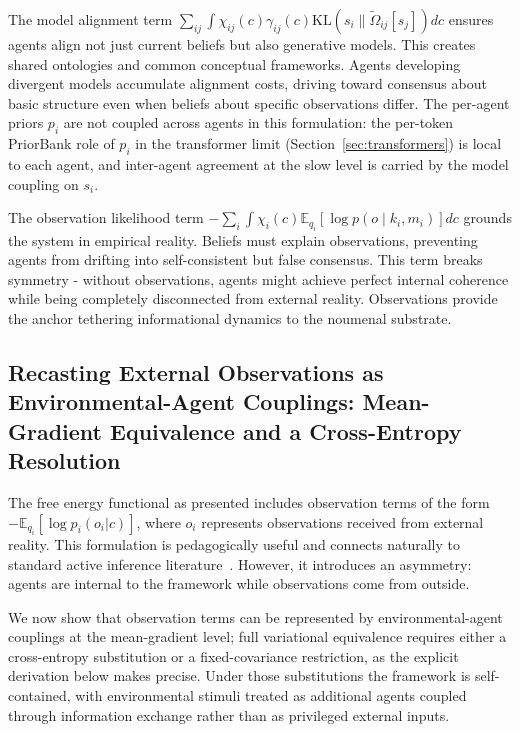 \documentclass[11pt]{article}
\begin{document}
The model alignment term $\sum_{ij} \int \chi_{ij}(c)  \gamma_{ij}(c)  \mathrm{KL}(s_i \| \tilde{\Omega}_{ij}[s_j])  dc$ ensures agents align not just current beliefs but also generative models. This creates shared ontologies and common conceptual frameworks. Agents developing divergent models accumulate alignment costs, driving toward consensus about basic structure even when beliefs about specific observations differ. The per-agent priors $p_i$ are not coupled across agents in this formulation: the per-token PriorBank role of $p_i$ in the transformer limit (Section~\ref{sec:transformers}) is local to each agent, and inter-agent agreement at the slow level is carried by the model coupling on $s_i$.

The observation likelihood term $-\sum_i \int \chi_i(c)  \mathbb{E}_{q_i}[\log p(o \mid k_i, m_i)]  dc$ grounds the system in empirical reality. Beliefs must explain observations, preventing agents from drifting into self-consistent but false consensus. This term breaks symmetry - without observations, agents might achieve perfect internal coherence while being completely disconnected from external reality. Observations provide the anchor tethering informational dynamics to the noumenal substrate.

\subsection{Recasting External Observations as Environmental-Agent Couplings: Mean-Gradient Equivalence and a Cross-Entropy Resolution}

The free energy functional as presented includes observation terms of the form $-\mathbb{E}_{q_i}[\log p_i(o_i|c)]$, where $o_i$ represents observations received from external reality. This formulation is pedagogically useful and connects naturally to standard active inference literature~\cite{Friston2010, parr2022active}. However, it introduces an asymmetry: agents are internal to the framework while observations come from outside.

We now show that observation terms can be represented by environmental-agent couplings at the mean-gradient level; full variational equivalence requires either a cross-entropy substitution or a fixed-covariance restriction, as the explicit derivation below makes precise. Under those substitutions the framework is self-contained, with environmental stimuli treated as additional agents coupled through information exchange rather than as privileged external inputs.
\end{document}

